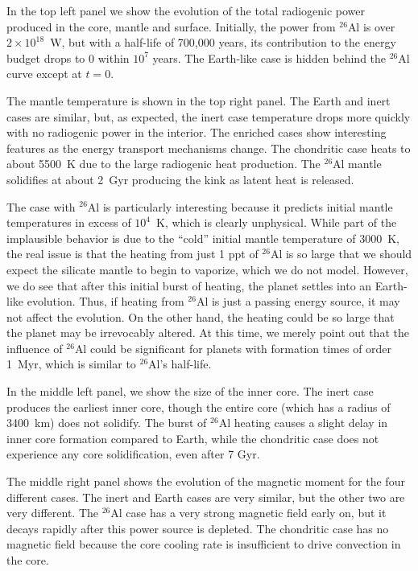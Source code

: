 \documentclass[preprint,12pt]{aastex}
\begin{document}
In the top left panel we show the evolution of the total radiogenic
power produced in the core, mantle and surface. Initially, the
power from $^{26}$Al is over $2 \times 10^{18}$~W, but with a
half-life of 700,000 years, its contribution to the energy budget
drops to 0 within $10^7$ years. The Earth-like case is hidden behind
the $^{26}$Al curve except at $t=0$.

The mantle temperature is shown in the top right
panel. The Earth and inert cases are similar, but, as expected, the
inert case temperature drops more quickly with no
radiogenic power in the interior. The enriched cases show interesting
features as the energy transport mechanisms change. The chondritic
case heats to about 5500~K due to the large radiogenic heat
production. The $^{26}$Al mantle solidifies at about 2~Gyr producing
the kink as latent heat is released.

The case with $^{26}$Al is particularly interesting because it
predicts initial mantle temperatures in excess of $10^4$~K, which is
clearly unphysical. While part of the implausible behavior is due to
the ``cold'' initial mantle temperature of 3000~K, the real issue is
that the heating from just 1 ppt of $^{26}$Al is so large that we should expect the silicate mantle to begin to vaporize, which we do not model. However, we do see that after this initial
burst of heating, the planet settles into an Earth-like
evolution. Thus, if heating from $^{26}$Al is just a passing energy
source, it may not affect the evolution. On the other hand, the
heating could be so large that the planet may be irrevocably
altered. At this time, we merely point out that the influence of
$^{26}$Al could be significant for planets with formation times of
order 1~Myr, which is similar to $^{26}$Al's half-life.

In the middle left panel, we show the size of the inner core. The
inert case produces the earliest inner core, though the entire core (which has a radius of 3400~km) does not solidify. The burst of $^{26}$Al
heating causes a slight delay in inner core formation compared to Earth,
while the chondritic case does not experience any core solidification, even
after 7 Gyr.

The middle right panel shows the evolution of the magnetic moment for
the four different cases. The inert and Earth cases are very similar,
but the other two are very different. The $^{26}$Al case has a very
strong magnetic field early on, but it decays rapidly after this power
source is depleted. The chondritic case has no magnetic field because
the core cooling rate is insufficient to drive convection in the
core.
\end{document}
